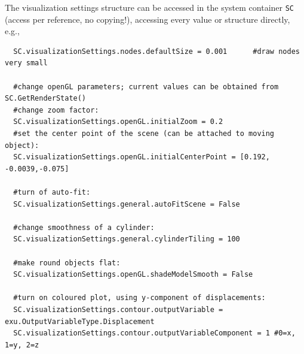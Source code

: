 
\noindent
The visualization settings structure can be accessed in the system container \texttt{SC} (access per reference, no copying!), accessing every value or structure directly, e.g.,
\pythonstyle\begin{lstlisting}
  SC.visualizationSettings.nodes.defaultSize = 0.001      #draw nodes very small

  #change openGL parameters; current values can be obtained from SC.GetRenderState()
  #change zoom factor:
  SC.visualizationSettings.openGL.initialZoom = 0.2       
  #set the center point of the scene (can be attached to moving object):
  SC.visualizationSettings.openGL.initialCenterPoint = [0.192, -0.0039,-0.075]

  #turn of auto-fit:
  SC.visualizationSettings.general.autoFitScene = False

  #change smoothness of a cylinder:
  SC.visualizationSettings.general.cylinderTiling = 100
  
  #make round objects flat:
  SC.visualizationSettings.openGL.shadeModelSmooth = False

  #turn on coloured plot, using y-component of displacements:
  SC.visualizationSettings.contour.outputVariable = exu.OutputVariableType.Displacement
  SC.visualizationSettings.contour.outputVariableComponent = 1 #0=x, 1=y, 2=z
\end{lstlisting}

